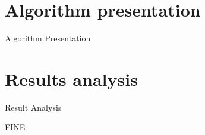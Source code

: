 \documentclass[12pt]{beamer}
\begin{document}
  \section{Algorithm presentation}
  \begin{frame}[fragile]{Algorithm Presentation}
  \end{frame}

  \section{Results analysis}
  \begin{frame}[fragile]{Result Analysis}
  \end{frame}

  \begin{frame}[standout]
  	FINE
  \end{frame}
\end{document}
